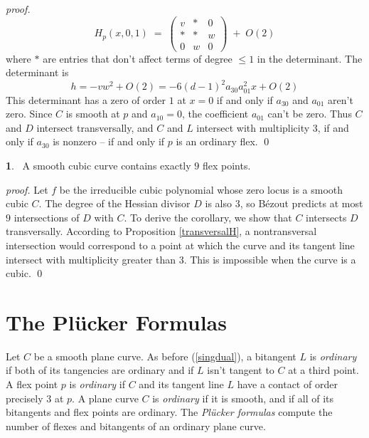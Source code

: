 \documentclass[leqno]{book}
\newcommand\Marginnote[1]{\marginnote{\hspace{-12pt}\normalfont{#1}}}
\theoremstyle{definition}%
\numberwithin{equation}{section}
\theoremstyle{theorem} %
\newtheorem{corollary}[equation]{}
\renewenvironment{proof}{\no \emph{proof.}}{}
\begin{document}
\begin{proof}
\begin{equation} H_p(x,0,1) \; = \; \begin{pmatrix}
v & * & 0\\
* & * & w\\
0 & w & 0
\end{pmatrix}
\; + \; O(2) \end{equation} where $*$ are entries that don't affect
terms of degree $\leq 1$ in the determinant.  The determinant is
$$h = -vw^2 + O(2)= -6(d-1)^2a_{30}a_{01}^2x + O(2)$$ This determinant
has a zero of order $1$ at $x=0$ if and only if $a_{30}$ and $a_{01}$
aren't zero.  Since $C$ is smooth at $p$ and $a_{10}=0$, the
coefficient $a_{01}$ can't be zero.  Thus $C$ and $D$ intersect
transversally, and $C$ and $L$ intersect with multiplicity $3$, if and
only if $a_{30}$ is nonzero -- if and only if $p$ is an ordinary flex.
\qed\end{proof}

\begin{corollary}{}\Marginnote{nineflexes}\;\,
A smooth cubic curve contains exactly $9$ flex points.
\label{nineflexes} \end{corollary}

\begin{proof} Let $f$ be the
irreducible cubic polynomial whose zero locus is a smooth cubic $C$.  The
degree of the Hessian divisor $D$ is also $3$, so B\'ezout predicts at
most $9$ intersections of $D$ with $C$.  To derive the corollary, we
show that $C$ intersects $D$ transversally.  According to Proposition
\ref{transversalH}, a nontransversal intersection would correspond to
a point at which the curve and its tangent line intersect with
multiplicity greater than $3$.  This is impossible when the curve is a
cubic.  \qed\end{proof}


 \section{The Pl\"ucker Formulas}
\Marginnote{plucker}\label{plucker}

Let $C$ be a smooth plane curve.  As before (\ref{singdual}), a
bitangent $L$ is {\it ordinary} if both of its tangencies are ordinary
and if $L$ isn't tangent to $C$ at a third point.  A flex point $p$ is
{\it ordinary} if $C$ and its tangent line $L$ have a contact of order
precisely $3$ at $p$.  A plane curve $C$ is {\it ordinary} if it is
smooth, and if all of its bitangents and flex points are ordinary.
The {\it{Pl\"ucker
    formulas}} compute the number of flexes and bitangents of an
ordinary plane curve.
\end{document}
